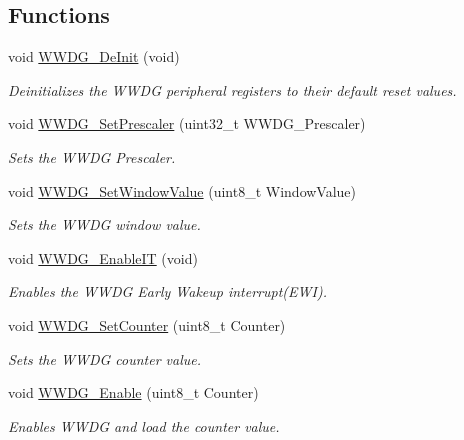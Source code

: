 \subsection*{Functions}
\begin{DoxyCompactItemize}
\item 
void \hyperlink{group___w_w_d_g___private___functions_ga7130f4dc861b9234b62e73f9f57f89a1}{W\+W\+D\+G\+\_\+\+De\+Init} (void)
\begin{DoxyCompactList}\small\item\em Deinitializes the W\+W\+DG peripheral registers to their default reset values. \end{DoxyCompactList}\item 
void \hyperlink{group___w_w_d_g___private___functions_gafeaa2b52c31ba7baca7eb61d2d42e07b}{W\+W\+D\+G\+\_\+\+Set\+Prescaler} (uint32\+\_\+t W\+W\+D\+G\+\_\+\+Prescaler)
\begin{DoxyCompactList}\small\item\em Sets the W\+W\+DG Prescaler. \end{DoxyCompactList}\item 
void \hyperlink{group___w_w_d_g___private___functions_gaf44a7bf8bf6b11b41cd89ff521fdd5a5}{W\+W\+D\+G\+\_\+\+Set\+Window\+Value} (uint8\+\_\+t Window\+Value)
\begin{DoxyCompactList}\small\item\em Sets the W\+W\+DG window value. \end{DoxyCompactList}\item 
void \hyperlink{group___w_w_d_g___private___functions_gac8af66ea5254d3d78b60b9b7c7f29521}{W\+W\+D\+G\+\_\+\+Enable\+IT} (void)
\begin{DoxyCompactList}\small\item\em Enables the W\+W\+DG Early Wakeup interrupt(\+E\+W\+I). \end{DoxyCompactList}\item 
void \hyperlink{group___w_w_d_g___private___functions_ga6e44cc35f133b28b9ad861f459bf8d76}{W\+W\+D\+G\+\_\+\+Set\+Counter} (uint8\+\_\+t Counter)
\begin{DoxyCompactList}\small\item\em Sets the W\+W\+DG counter value. \end{DoxyCompactList}\item 
void \hyperlink{group___w_w_d_g___private___functions_ga10dc2554d0b504b5472e3ecf0f02a9e6}{W\+W\+D\+G\+\_\+\+Enable} (uint8\+\_\+t Counter)
\begin{DoxyCompactList}\small\item\em Enables W\+W\+DG and load the counter value. \end{DoxyCompactList}\item 

\end{DoxyCompactItemize}
